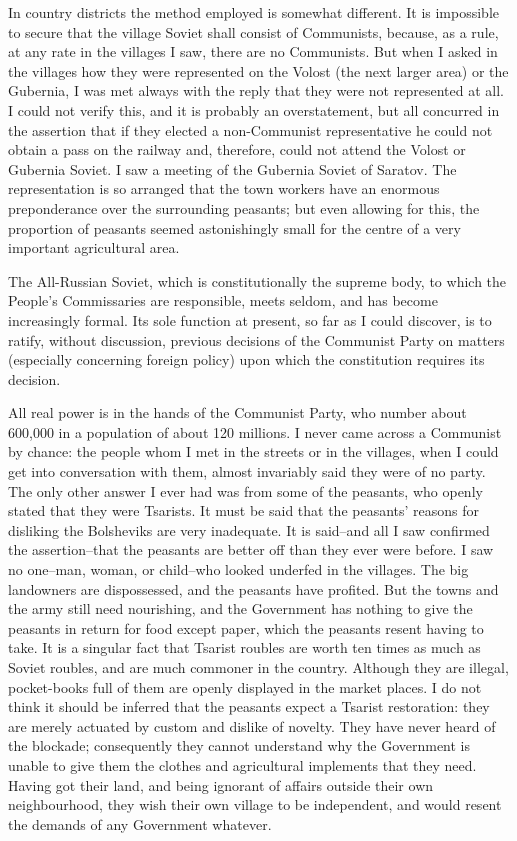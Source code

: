 In country districts the method employed is somewhat different. It is impossible to secure that the village Soviet shall consist of Communists, because, as a rule, at any rate in the villages I saw, there are no Communists. But when I asked in the villages how they were represented on the Volost (the next larger area) or the Gubernia, I was met always with the reply that they were not represented at all. I could not verify this, and it is probably an overstatement, but all concurred in the assertion that if they elected a non-Communist representative he could not obtain a pass on the railway and, therefore, could not attend the Volost or Gubernia Soviet. I saw a meeting of the Gubernia Soviet of Saratov. The representation is so arranged that the town workers have an enormous preponderance over the surrounding peasants; but even allowing for this, the proportion of peasants seemed astonishingly small for the centre of a very important agricultural area.

The All-Russian Soviet, which is constitutionally the supreme body, to which the People's Commissaries are responsible, meets seldom, and has become increasingly formal. Its sole function at present, so far as I could discover, is to ratify, without discussion, previous decisions of the Communist Party on matters (especially concerning foreign policy) upon which the constitution requires its decision.

All real power is in the hands of the Communist Party, who number about 600,000 in a population of about 120 millions. I never came across a Communist by chance: the people whom I met in the streets or in the villages, when I could get into conversation with them, almost invariably said they were of no party. The only other answer I ever had was from some of the peasants, who openly stated that they were Tsarists. It must be said that the peasants' reasons for disliking the Bolsheviks are very inadequate. It is said--and all I saw confirmed the assertion--that the peasants are better off than they ever were before. I saw no one--man, woman, or child--who looked underfed in the villages. The big landowners are dispossessed, and the peasants have profited. But the towns and the army still need nourishing, and the Government has nothing to give the peasants in return for food except paper, which the peasants resent having to take. It is a singular fact that Tsarist roubles are worth ten times as much as Soviet roubles, and are much commoner in the country. Although they are illegal, pocket-books full of them are openly displayed in the market places. I do not think it should be inferred that the peasants expect a Tsarist restoration: they are merely actuated by custom and dislike of novelty. They have never heard of the blockade; consequently they cannot understand why the Government is unable to give them the clothes and agricultural implements that they need. Having got their land, and being ignorant of affairs outside their own neighbourhood, they wish their own village to be independent, and would resent the demands of any Government whatever.


